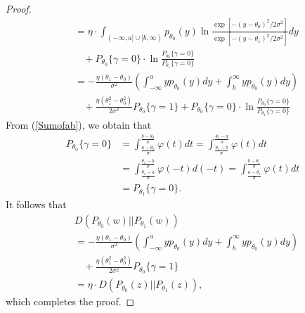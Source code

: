 \documentclass[journal]{IEEEtran}
\begin{document}
\begin{proof}
\begin{equation*}
\begin{split}
&= \eta  \cdot \int_{( - \infty ,a] \cup [b,\infty )}^{} {{p_{{\theta _0}}}(y)\ln \frac{{\exp [ - {{(y - {\theta _0})}^2}/2{\sigma ^2}]}}{{\exp [ - {{(y - {\theta _1})}^2}/2{\sigma ^2}]}}} dy\\
&~~~~+ {P_{{\theta _0}}}\{ \gamma  = 0\}  \cdot \ln \frac{{{P_{{\theta _0}}}\{ \gamma  = 0\} }}{{{P_{{\theta _1}}}\{ \gamma  = 0\} }}\\
&=  - \frac{{\eta({\theta _1} - {\theta _0}) }}{{{\sigma ^2}}}\left( {\int_{ - \infty }^a {y{p_{{\theta _0}}}(y)dy}  + \int_b^\infty  {y{p_{{\theta _0}}}(y)dy} } \right)\\
&~~~~+\frac{{\eta(\theta _1^2 - \theta _0^2) }}{{2{\sigma ^2}}}{P_{{\theta _0}}}\{ \gamma  = 1\} +{P_{{\theta _0}}}\{ \gamma  = 0\}  \cdot \ln \frac{{{P_{{\theta _0}}}\{ \gamma  = 0\} }}{{{P_{{\theta _1}}}\{ \gamma  = 0\} }}
\end{split}
\end{equation*}
From (\ref{Sumofab}), we obtain that
\begin{equation*}
\begin{split}
{P_{{\theta _0}}}\{\gamma  = 0\} &= \int_{\frac{{{a} - {\theta _0}}}{\sigma }}^{\frac{{{b} - {\theta _0}}}{\sigma }} {\varphi (t)dt}  = \int_{\frac{{{\theta _1} - {b}}}{\sigma }}^{\frac{{{\theta _1} - {a}}}{\sigma }} {\varphi (t)dt} \\
&= \int_{\frac{{{\theta _1} - {a}}}{\sigma }}^{\frac{{{\theta _1} - {b}}}{\sigma }} {\varphi ( - t)d( - t)}  = \int_{\frac{{{a} - {\theta _1}}}{\sigma }}^{\frac{{{b} - {\theta _1}}}{\sigma }} {\varphi (t)dt} \\
& = {P_{{\theta _1}}}\{\gamma  = 0\}.
\end{split}
\end{equation*}
It follows that
\begin{equation}
\begin{split}
&D(P_{\theta_0}({w})||P_{\theta_1}({w}))\\
&=  - \frac{{\eta({\theta _1} - {\theta _0}) }}{{{\sigma ^2}}}\left( {\int_{ - \infty }^a {y{p_{{\theta _0}}}(y)dy}  + \int_b^\infty  {y{p_{{\theta _0}}}(y)dy} } \right)\\
&~~~~+\frac{{\eta(\theta _1^2 - \theta _0^2) }}{{2{\sigma ^2}}}{P_{{\theta _0}}}\{ \gamma  = 1\}\\
&=\eta \cdot D(P_{\theta_0}({z})||P_{\theta_1}({z})),
\end{split}
\end{equation}
which completes the proof.
\end{proof}
\end{document}
